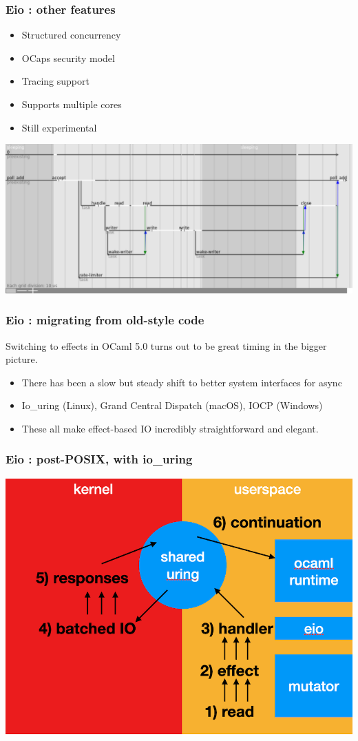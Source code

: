 \documentclass{beamer}
\begin{document}
\begin{frame}
	\frametitle{Eio : other features}
	\begin{itemize}
		\item Structured concurrency
		\item OCaps security model
		\item Tracing support
		\item Supports multiple cores
		\item Still experimental
	\end{itemize}
	\includegraphics[width=\textwidth]{trace.png}
\end{frame}

\begin{frame}
	\frametitle{Eio : migrating from old-style code}
  Switching to effects in OCaml 5.0 turns out to be great timing in the bigger picture.
	\begin{itemize}
		\item There has been a slow but steady shift to better system interfaces for async
		\item Io\_uring (Linux), Grand Central Dispatch (macOS), IOCP (Windows)
		\item These all make effect-based IO incredibly straightforward and elegant.
	\end{itemize}
\end{frame}

\begin{frame}
	\frametitle{Eio : post-POSIX, with io\_uring}
  \includegraphics[width=\textwidth]{uring.png}
\end{frame}
\end{document}
